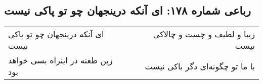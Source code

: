 \begin{center}
\section*{رباعی شماره ۱۷۸: ای آنکه درینجهان چو تو پاکی نیست}
\label{sec:0178}
\begin{longtable}{l p{0.5cm} r}
ای آنکه درینجهان چو تو پاکی نیست
&&
زیبا و لطیف و چست و چالاکی نیست
\\
زین طعنه در اینراه بسی خواهد بود
&&
با ما تو چگونه‌ای دگر باکی نیست
\\
\end{longtable}
\end{center}
